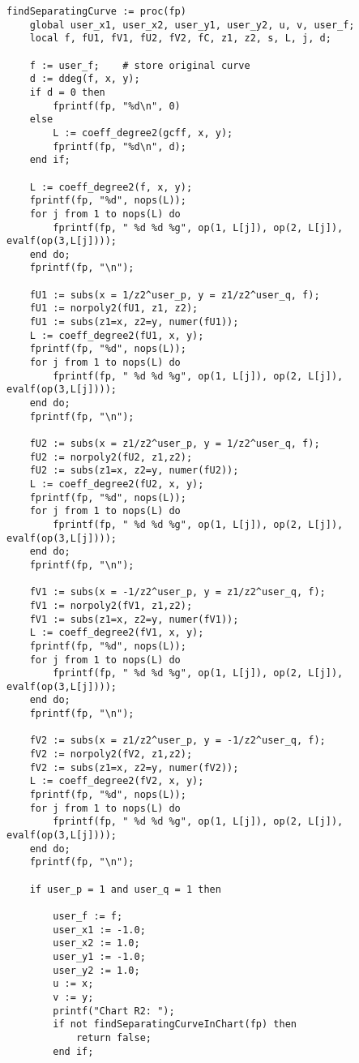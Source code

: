 \documentclass[a4paper,10pt]{article}
\begin{document}
\begin{lstlisting}[name=separatingcurves]
findSeparatingCurve := proc(fp)
    global user_x1, user_x2, user_y1, user_y2, u, v, user_f;
    local f, fU1, fV1, fU2, fV2, fC, z1, z2, s, L, j, d;

    f := user_f;    # store original curve
    d := ddeg(f, x, y);
    if d = 0 then
        fprintf(fp, "%d\n", 0)
    else
        L := coeff_degree2(gcff, x, y);
        fprintf(fp, "%d\n", d);
    end if;

    L := coeff_degree2(f, x, y);
    fprintf(fp, "%d", nops(L));
    for j from 1 to nops(L) do
        fprintf(fp, " %d %d %g", op(1, L[j]), op(2, L[j]), evalf(op(3,L[j])));
    end do;
    fprintf(fp, "\n");

    fU1 := subs(x = 1/z2^user_p, y = z1/z2^user_q, f);
    fU1 := norpoly2(fU1, z1, z2);
    fU1 := subs(z1=x, z2=y, numer(fU1));
    L := coeff_degree2(fU1, x, y);
    fprintf(fp, "%d", nops(L));
    for j from 1 to nops(L) do
        fprintf(fp, " %d %d %g", op(1, L[j]), op(2, L[j]), evalf(op(3,L[j])));
    end do;
    fprintf(fp, "\n");

    fU2 := subs(x = z1/z2^user_p, y = 1/z2^user_q, f);
    fU2 := norpoly2(fU2, z1,z2);
    fU2 := subs(z1=x, z2=y, numer(fU2));
    L := coeff_degree2(fU2, x, y);
    fprintf(fp, "%d", nops(L));
    for j from 1 to nops(L) do
        fprintf(fp, " %d %d %g", op(1, L[j]), op(2, L[j]), evalf(op(3,L[j])));
    end do;
    fprintf(fp, "\n");

    fV1 := subs(x = -1/z2^user_p, y = z1/z2^user_q, f);
    fV1 := norpoly2(fV1, z1,z2);
    fV1 := subs(z1=x, z2=y, numer(fV1));
    L := coeff_degree2(fV1, x, y);
    fprintf(fp, "%d", nops(L));
    for j from 1 to nops(L) do
        fprintf(fp, " %d %d %g", op(1, L[j]), op(2, L[j]), evalf(op(3,L[j])));
    end do;
    fprintf(fp, "\n");

    fV2 := subs(x = z1/z2^user_p, y = -1/z2^user_q, f);
    fV2 := norpoly2(fV2, z1,z2);
    fV2 := subs(z1=x, z2=y, numer(fV2));
    L := coeff_degree2(fV2, x, y);
    fprintf(fp, "%d", nops(L));
    for j from 1 to nops(L) do
        fprintf(fp, " %d %d %g", op(1, L[j]), op(2, L[j]), evalf(op(3,L[j])));
    end do;
    fprintf(fp, "\n");

    if user_p = 1 and user_q = 1 then

        user_f := f;
        user_x1 := -1.0;
        user_x2 := 1.0;
        user_y1 := -1.0;
        user_y2 := 1.0;
        u := x;
        v := y;
        printf("Chart R2: ");
        if not findSeparatingCurveInChart(fp) then
            return false;
        end if;


\end{lstlisting}
\end{document}
